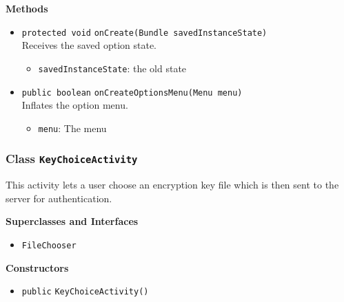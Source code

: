 \textbf{Methods}
\begin{itemize}
\item \lstinline|protected void| \lstinline|onCreate|\lstinline|(Bundle savedInstanceState)|\\
Receives the saved option state.
\begin{itemize}
\item \lstinline|savedInstanceState|: the old state
\end{itemize}



\item \lstinline|public boolean| \lstinline|onCreateOptionsMenu|\lstinline|(Menu menu)|\\
Inflates the option menu.
\begin{itemize}
\item \lstinline|menu|: The menu
\end{itemize}



\end{itemize}

\subsubsection{Class \lstinline|KeyChoiceActivity|}
This activity lets a user choose an encryption key file
 which is then sent to the server for authentication. \\



\textbf{Superclasses and Interfaces}
\begin{itemize}
\item \lstinline|FileChooser|
\end{itemize}



\textbf{Constructors}
\begin{itemize}
\item \lstinline|public| \lstinline|KeyChoiceActivity|\lstinline|()|




\end{itemize}


